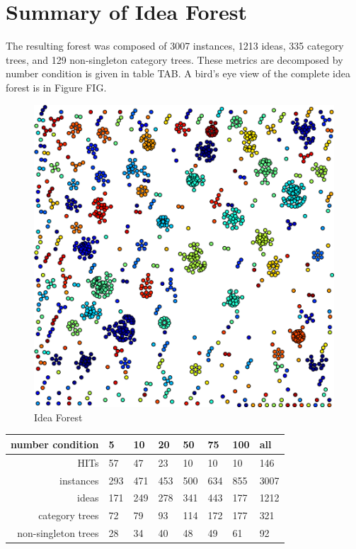 \section{Summary of Idea Forest}

The resulting forest was composed of 3007 instances, 1213 ideas, 335 category trees, and 129 non-singleton category trees. These metrics are decomposed by number condition is given in table TAB. A bird's eye view of the complete idea forest is in Figure FIG.

\begin{figure}[h!]
    \centering
    \includegraphics[width=0.9\columnwidth]{idea_forest}
    \caption{Idea Forest}
\end{figure}

\begin{table}
	\begin{tabular}[h!]{r | l l l l l l l}
	\textbf{number condition} & 5 & 10 & 20 & 50 & 75 & 100 & all \\ \hline \hline
	HITs & 57 & 47 & 23 & 10 & 10 & 10 & 146\\
	instances & 293 & 471 & 453 & 500 & 634 & 855 & 3007\\
	ideas & 171 & 249 & 278 & 341 & 443 & 177 &1212\\
	category trees & 72 & 79 & 93 & 114 & 172 & 177 &321\\
	non-singleton trees & 28 & 34 & 40 & 48 & 49 & 61 &92\\
	\end{tabular}
\end{table}


